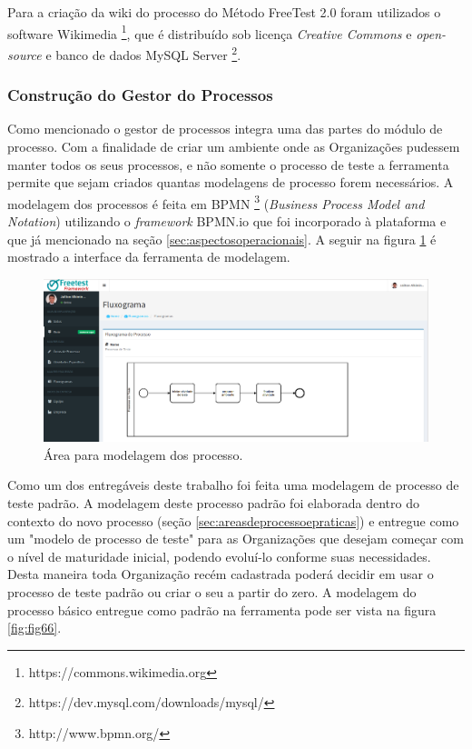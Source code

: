 Para a criação da wiki do processo do Método FreeTest 2.0 foram utilizados o software Wikimedia \footnote{https://commons.wikimedia.org}, que é distribuído sob licença \textit{Creative Commons} e \textit{open-source} e banco de dados MySQL Server \footnote{https://dev.mysql.com/downloads/mysql/}.

\subsubsection{Construção do Gestor do Processos} 
\label{sec:gestordeprocessos}

Como mencionado o gestor de processos integra uma das partes do módulo de processo. Com a finalidade de criar um ambiente onde as Organizações pudessem manter todos os seus processos, e não somente o processo de teste a ferramenta permite que sejam criados quantas modelagens de processo forem necessários. A modelagem dos processos é feita em BPMN \footnote{http://www.bpmn.org/} (\textit{Business Process Model and Notation}) utilizando o \textit{framework} BPMN.io que foi incorporado à plataforma e que já mencionado na seção \ref{sec:aspectosoperacionais}. A seguir na figura \ref{fig:fig65} é mostrado a interface da ferramenta de modelagem.

\begin{figure}[H]
\centering
\includegraphics[width=.90\textwidth]{fig/figura65.png}
\caption{Área para modelagem dos processo.}
\label{fig:fig65}
\end{figure}

Como um dos entregáveis deste trabalho foi feita uma modelagem de processo de teste padrão. A modelagem deste processo padrão foi elaborada dentro do contexto do novo processo (seção \ref{sec:areasdeprocessoepraticas}) e entregue como um "modelo de processo de teste" para as Organizações que desejam começar com o nível de maturidade inicial, podendo evoluí-lo conforme suas necessidades. Desta maneira toda Organização recém cadastrada poderá decidir em usar o processo de teste padrão ou criar o seu a partir do zero. A modelagem do processo básico entregue como padrão na ferramenta pode ser vista na figura \ref{fig:fig66}.

